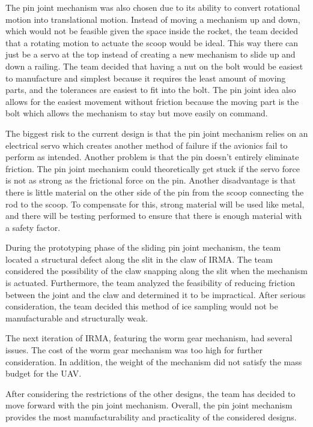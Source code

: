 		The pin joint mechanism was also chosen due to its ability to convert rotational motion into translational motion. Instead of moving a mechanism up and down, which would not be feasible given the space inside the rocket, the team decided that a rotating motion to actuate the scoop would be ideal. This way there can just be a servo at the top instead of creating a new mechanism to slide up and down a railing. The team decided that having a nut on the bolt would be easiest to manufacture and simplest because it requires the least amount of moving parts, and the tolerances are easiest to fit into the bolt. The pin joint idea also allows for the easiest movement without friction because the moving part is the bolt which allows the mechanism to stay but move easily on command.

		The biggest risk to the current design is that the pin joint mechanism relies on an electrical servo which creates another method of failure if the avionics fail to perform as intended. Another problem is that the pin doesn’t entirely eliminate friction. The pin joint mechanism could theoretically get stuck if the servo force is not as strong as the frictional force on the pin. Another disadvantage is that there is little material on the other side of the pin from the scoop connecting the rod to the scoop. To compensate for this, strong material will be used like metal, and there will be testing performed to ensure that there is enough material with a safety factor.

		During the prototyping phase of the sliding pin joint mechanism, the team located a structural defect along the slit in the claw of IRMA. The team considered the possibility of the claw snapping along the slit when the mechanism is actuated. Furthermore, the team analyzed the feasibility of reducing friction between the joint and the claw and determined it to be impractical. After serious consideration, the team decided this method of ice sampling would not be manufacturable and structurally weak.

		The next iteration of IRMA, featuring the worm gear mechanism, had several issues. The cost of the worm gear mechanism was too high for further consideration. In addition, the weight of the mechanism did not satisfy the mass budget for the UAV. 

		After considering the restrictions of the other designs, the team has decided to move forward with the pin joint mechanism. Overall, the pin joint mechanism provides the most manufacturability and practicality of the considered designs. 


